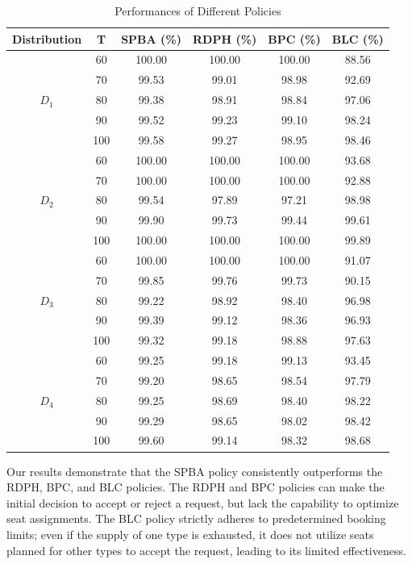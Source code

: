\begin{table}[h]
  \centering
  \caption{Performances of Different Policies}\label{tab_perf}
  \begin{tabular}{cccccc}
  \hline
  \hline
  Distribution & T & SPBA (\%) & RDPH (\%) & BPC (\%) & BLC (\%) \\
  \hline
  \multirow{5}{*}{$D_1$} & 60 & 100.00 & 100.00 & 100.00 & 88.56 \\
  & 70    & 99.53 & 99.01 & 98.98 & 92.69  \\
  & 80    & 99.38 & 98.91 & 98.84 & 97.06  \\
  & 90    & 99.52 & 99.23 & 99.10 & 98.24  \\
  & 100   & 99.58 & 99.27 & 98.95 & 98.46 \\
  \hline
  \multirow{5}{*}{$D_2$} & 60  & 100.00 & 100.00 & 100.00 & 93.68  \\
     & 70  & 100.00 & 100.00 & 100.00 & 92.88  \\
     & 80  & 99.54 & 97.89 & 97.21 & 98.98  \\
     & 90  & 99.90 & 99.73 & 99.44 & 99.61  \\
     & 100 & 100.00 & 100.00 & 100.00 & 99.89  \\ 
  \hline
  \multirow{5}{*}{$D_3$} & 60  & 100.00 & 100.00 & 100.00 & 91.07  \\
  & 70  & 99.85 & 99.76 & 99.73 & 90.15 \\
  & 80  & 99.22 & 98.92 & 98.40 & 96.98  \\
  & 90  & 99.39 & 99.12 & 98.36 & 96.93  \\
  & 100  & 99.32 & 99.18 & 98.88 & 97.63  \\
    \hline
    \multirow{5}{*}{$D_4$} & 60  & 99.25 & 99.18 & 99.13 & 93.45  \\
     & 70  & 99.20 & 98.65 & 98.54 & 97.79  \\
     & 80  & 99.25 & 98.69 & 98.40 & 98.22 \\
     & 90  & 99.29 & 98.65 & 98.02 & 98.42  \\
     & 100 & 99.60 & 99.14 & 98.32 & 98.68 \\
  \hline
  \hline
  \end{tabular}
\end{table}

Our results demonstrate that the SPBA policy consistently outperforms the RDPH, BPC, and BLC policies. The RDPH and BPC policies can make the initial decision to accept or reject a request, but lack the capability to optimize seat assignments. The BLC policy strictly adheres to predetermined booking limits; even if the supply of one type is exhausted, it does not utilize seats planned for other types to accept the request, leading to its limited effectiveness.

